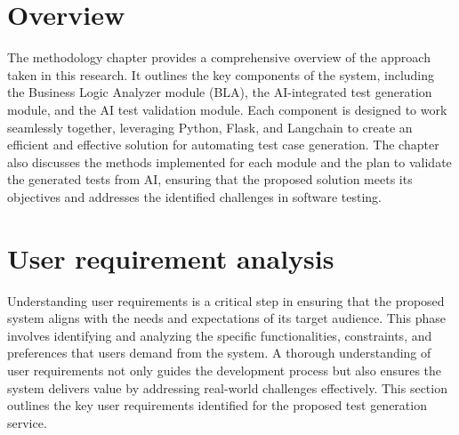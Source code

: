 \section{Overview}

\hspace{0.5cm}The methodology chapter provides a comprehensive overview of the approach taken in this research. It outlines the key components of the system, including the Business Logic Analyzer module (BLA), the AI-integrated test generation module, and the AI test validation module. Each component is designed to work seamlessly together, leveraging Python, Flask, and Langchain to create an efficient and effective solution for automating test case generation. The chapter also discusses the methods implemented for each module and the plan to validate the generated tests from AI, ensuring that the proposed solution meets its objectives and addresses the identified challenges in software testing.
\section{User requirement analysis}

\hspace{0.5cm}Understanding user requirements is a critical step in ensuring that the proposed system aligns with the needs and expectations of its target audience. This phase involves identifying and analyzing the specific functionalities, constraints, and preferences that users demand from the system. A thorough understanding of user requirements not only guides the development process but also ensures the system delivers value by addressing real-world challenges effectively. This section outlines the key user requirements identified for the proposed test generation service.

\clearpage

